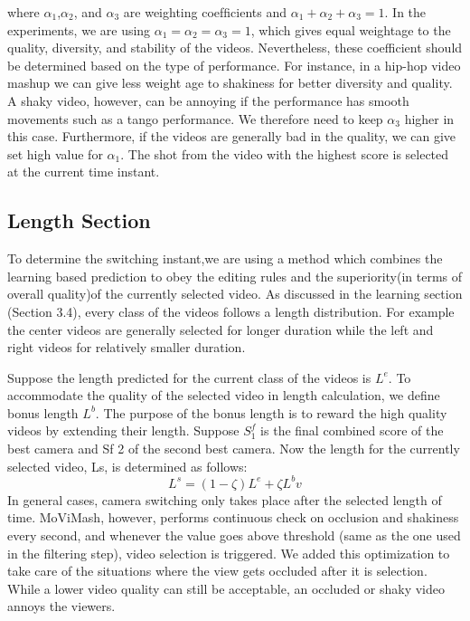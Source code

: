 \documentclass{sig-alternate}
\begin{document}
where \(\alpha_1\),\(\alpha_2\), and \(\alpha_3\) are weighting coefﬁcients and \(\alpha_1 + \alpha_2 + \alpha_3 =1\). In the experiments, we are using \(\alpha_1 = \alpha_2 = \alpha_3 =1\),
which gives equal weightage to the quality, diversity, and stability of the videos. Nevertheless, these coefficient should be determined based on the type of performance. For instance, in a hip-hop video mashup we can give less weight age to shakiness for better diversity and quality. A shaky video, however, can be annoying if the performance has smooth movements such as a tango performance. We therefore need to keep \(\alpha_3\) higher in this case. Furthermore, if the videos are generally bad in the quality, we can give set high value for \(\alpha_1\). The shot from the video with the highest score is selected at the current time instant. 

\subsection{Length Section}
To determine the switching instant,we are using a method which combines the learning based prediction to obey the editing rules and the superiority(in terms of overall quality)of the currently selected video. As discussed in the learning section (Section 3.4), every class of the videos follows a length distribution. For example the center videos are generally selected for longer duration while the left and right videos for relatively smaller duration. 

Suppose the length predicted for the current class of the videos is \(L^e\). To accommodate the quality of the selected video in length calculation, we deﬁne bonus length \(L^b\). The purpose of the bonus length is to reward the high quality videos by extending their length. Suppose \(S^f_1\) is the ﬁnal combined score of the best camera and Sf 2 of the second best camera. Now the length for the currently selected video, Ls, is determined as follows:
\begin{equation}
L^s = (1- \zeta)L^e + \zeta L^bv
\end{equation}
In general cases, camera switching only takes place after the selected length of time. MoViMash, however, performs continuous check on occlusion and shakiness every second, and whenever the value goes above threshold (same as the one used in the ﬁltering step), video selection is triggered. We added this optimization to take care of the situations where the view gets occluded after it is selection. While a lower video quality can still be acceptable, an occluded or shaky video annoys the viewers.
\end{document}
